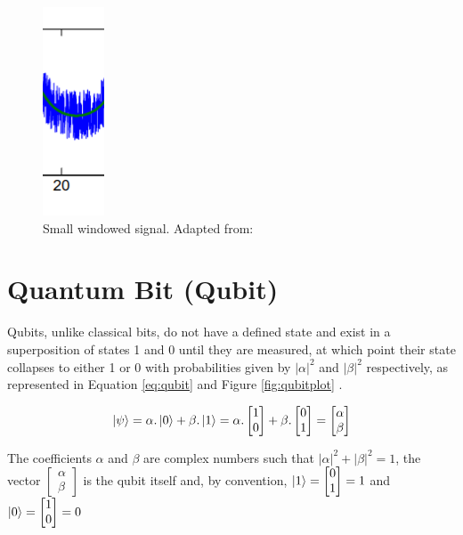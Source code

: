 		
		\begin{figure}[!h]
			\centering
			\includegraphics[width=0.1\linewidth]{images/windowedNoisySignal}
			\caption[Windowed signal]{Small windowed signal. Adapted from: \cite{olama2011design}}
			\label{fig:windowednoisysignal}
		\end{figure}

	
	\section{Quantum Bit (Qubit)}
		\par Qubits, unlike classical bits, do not have a defined state and exist in a superposition of states 1 and 0 until they are measured, at which point their state collapses to either 1 or 0 with probabilities given by $|\alpha|^2$ and $|\beta|^2$ respectively, as represented in Equation \ref{eq:qubit} and Figure \ref{fig:qubitplot} \cite{da2018introduccao}.
		
		\begin{equation}
			\ket{\psi} = \alpha . \ket{0} + \beta . \ket{1} = 
			\alpha . \begin{bmatrix}
				1 \\
				0
			\end{bmatrix} + \beta .	\begin{bmatrix}
				0 \\
				1
			\end{bmatrix} = 
			\begin{bmatrix}
				\alpha \\
				\beta
			\end{bmatrix}
			\label{eq:qubit}
		\end{equation}
	
		\par The coefficients $\alpha$ and $\beta$ are complex numbers such that ${|\alpha|}^2 + {|\beta|}^2 = 1$, the vector 
		$\begin{bmatrix}
			\alpha \\
			\beta 
		\end{bmatrix}$ is the qubit itself and, by convention, $\ket{1} = 
		\begin{bmatrix}
			0 \\
			1
		\end{bmatrix} = 1$ and $\ket{0} = 
		\begin{bmatrix}
			1 \\
			0
		\end{bmatrix} = 0$
	

